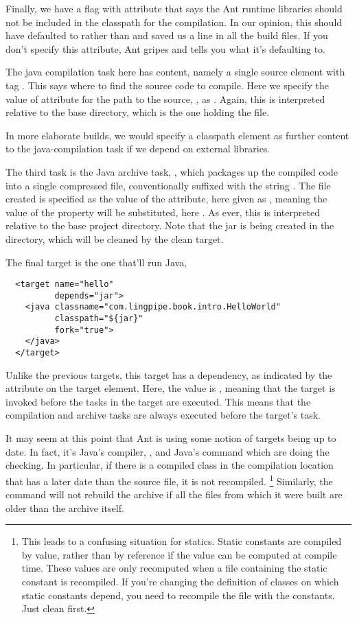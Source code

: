 Finally, we have a flag with attribute  that
says the Ant runtime libraries should not be included in the classpath
for the compilation.  In our opinion, this should have defaulted to
 rather than  and saved us a line in all the
build files.  If you don't specify this attribute, Ant gripes and
tells you what it's defaulting to.

The java compilation task here has content, namely a single
source element with tag .  This says where to find
the source code to compile.  Here we specify the value of
attribute for the path to the source, , as
.  Again, this is interpreted relative to the base directory,
which is the one holding the  file.  

In more elaborate builds, we would specify a classpath element as
further content to the java-compilation task if we depend on external
libraries.  

The third task is the Java archive task, , which packages up
the compiled code into a single compressed file, conventionally
suffixed with the string .  The file created is specified
as the value of the  attribute, here given as
, meaning the value of the  property will be
substituted, here .  As ever, this is
interpreted relative to the base project directory.  Note that the jar
is being created in the  directory, which will be cleaned
by the clean target.  

The final target is the one that'll run Java,

\begin{verbatim}
  <target name="hello"
          depends="jar">
    <java classname="com.lingpipe.book.intro.HelloWorld"
          classpath="${jar}"
          fork="true">
    </java>
  </target>
\end{verbatim}
%
Unlike the previous targets, this target has a dependency, as
indicated by the  attribute on the target element.
Here, the value is , meaning that the  target is
invoked before the tasks in the  target are executed.
This means that the compilation and archive tasks are always executed
before the  target's task.  

It may seem at this point that Ant is using some notion of targets
being up to date.  In fact, it's Java's compiler, , and
Java's  command which are doing the checking.  In
particular, if there is a compiled class in the compilation location
that has a later date than the source file, it is not recompiled.%
%
\footnote{This leads to a confusing situation for statics.  Static
constants are compiled by value, rather than by reference if the value
can be computed at compile time.  These values are only recomputed
when a file containing the static constant is recompiled.  If you're
changing the definition of classes on which static constants depend,
you need to recompile the file with the constants.  Just clean first.}
%
Similarly, the  command will not rebuild the archive if
all the files from which it were built are older than the archive
itself.

